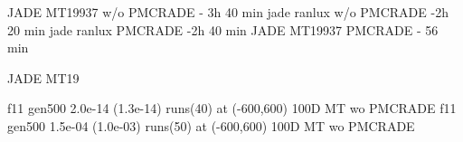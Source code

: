 JADE MT19937 w/o PMCRADE - 3h 40 min
jade ranlux w/o PMCRADE -2h 20 min
jade ranlux  PMCRADE -2h 40 min
JADE MT19937  PMCRADE - 56 min

JADE MT19

f11	gen500	2.0e-14 (1.3e-14) runs(40) at (-600,600)   100D MT wo PMCRADE
f11	gen500	1.5e-04 (1.0e-03) runs(50) at (-600,600) 100D MT wo PMCRADE



\begingroup %
\renewcommand{\arraystretch}{1.6}%
